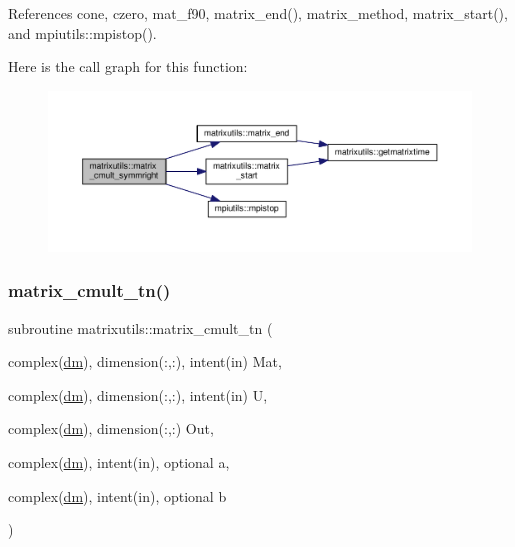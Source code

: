 References cone, czero, mat\+\_\+f90, matrix\+\_\+end(), matrix\+\_\+method, matrix\+\_\+start(), and mpiutils\+::mpistop().

Here is the call graph for this function\+:
\nopagebreak
\begin{figure}[H]
\begin{center}
\leavevmode
\includegraphics[width=350pt]{namespacematrixutils_a2098ca04f94da631caf2ebcce5ad7bf9_cgraph}
\end{center}
\end{figure}
\mbox{\label{namespacematrixutils_a7c5f8b5e283bec1dcdcc4b82abbebd47}} 
\subsubsection{\texorpdfstring{matrix\+\_\+cmult\+\_\+tn()}{matrix\_cmult\_tn()}}
{\footnotesize\ttfamily subroutine matrixutils\+::matrix\+\_\+cmult\+\_\+tn (\begin{DoxyParamCaption}\item[{complex(\mbox{\hyperlink{namespacematrixutils_a7bdc564986ea4d90f51201c75606ef3d}{dm}}), dimension(\+:,\+:), intent(in)}]{Mat,  }\item[{complex(\mbox{\hyperlink{namespacematrixutils_a7bdc564986ea4d90f51201c75606ef3d}{dm}}), dimension(\+:,\+:), intent(in)}]{U,  }\item[{complex(\mbox{\hyperlink{namespacematrixutils_a7bdc564986ea4d90f51201c75606ef3d}{dm}}), dimension(\+:,\+:)}]{Out,  }\item[{complex(\mbox{\hyperlink{namespacematrixutils_a7bdc564986ea4d90f51201c75606ef3d}{dm}}), intent(in), optional}]{a,  }\item[{complex(\mbox{\hyperlink{namespacematrixutils_a7bdc564986ea4d90f51201c75606ef3d}{dm}}), intent(in), optional}]{b }\end{DoxyParamCaption})}



